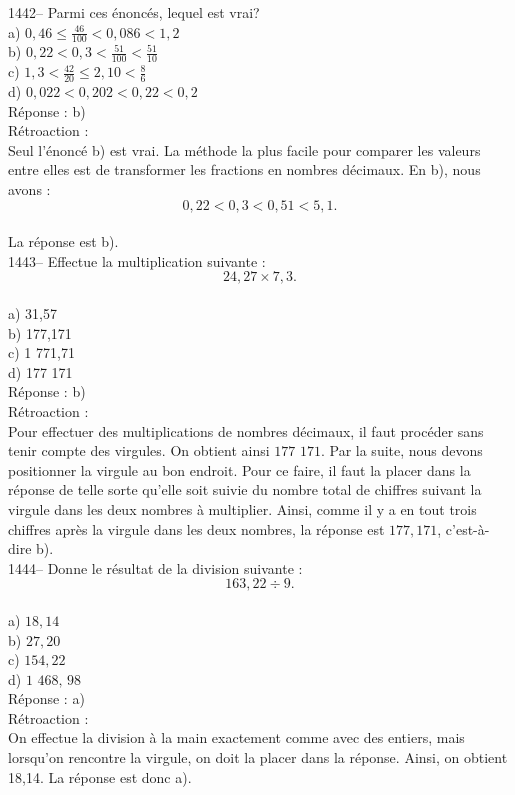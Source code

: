 1442-- Parmi ces \'enonc\'es, lequel est vrai?\\[3mm]
a) $0,46\le\frac{46}{100}<0,086<1,2$\\[3mm]
b) $0,22<0,3<\frac{51}{100}<\frac{51}{10}$\\[3mm]
c) $1,3<\frac{42}{20}\le2,10<\frac{8}{6}$\\[3mm]
d) $0,022<0,202<0,22<0,2$\\

R\'eponse : b)\\

R\'etroaction :\\
Seul l'\'enonc\'e b) est vrai. La m\'ethode la plus facile pour
comparer les valeurs entre elles est de transformer les fractions en
nombres d\'ecimaux. En b), nous avons : $$0,22<0,3<0,51<5,1.$$\\La
r\'eponse est b).\\

1443-- Effectue la multiplication suivante : $$24,27\times7,3.$$\\
a) 31,57\\
b) 177,171\\
c) 1 771,71\\
d) 177 171\\

R\'eponse : b)\\

R\'etroaction :\\
Pour effectuer des multiplications de nombres d\'ecimaux, il faut
proc\'eder sans tenir compte des virgules. On obtient ainsi
${\textrm{177 171}}$. Par la suite, nous devons positionner la
virgule au bon endroit. Pour ce faire, il faut la placer dans la
r\'eponse de telle sorte qu'elle soit suivie du nombre total de
chiffres suivant la virgule dans les deux nombres \`a multiplier.
Ainsi, comme il y a en tout trois chiffres apr\`es la virgule dans
les deux nombres, la r\'eponse
est $177,171$, c'est-\`a-dire b).\\

1444-- Donne le r\'esultat de la division suivante : $$163,22\div9.$$\\
a) $18,14$\\
b) $27,20$\\
c) $154,22$\\
d) ${\textrm{1 468, 98}}$\\

R\'eponse : a)\\

R\'etroaction :\\
On effectue la division \`a la main exactement comme avec des entiers, mais
lorsqu'on rencontre la virgule, on doit la placer dans la r\'eponse. Ainsi,
on obtient 18,14. La r\'eponse est donc a).\\

